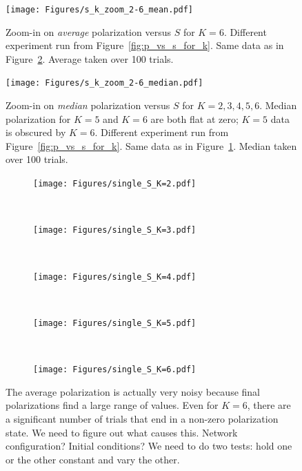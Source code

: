 \documentclass[11pt,letterpaper]{article}
\begin{document}
\begin{figure}[t!]
  \centering
    \texttt{[image: Figures/s\_k\_zoom\_2-6\_mean.pdf]}
  \caption{Zoom-in on \emph{average} polarization versus $S$ for $K=6$. 
  Different experiment run from Figure~\ref{fig:p_vs_s_for_k}. 
  Same data as in Figure~\ref{fig:zoom_median}.
  Average taken over 100 trials.}
  \label{fig:zoom_average}
\end{figure}

\begin{figure}[h!]
  \centering
    \texttt{[image: Figures/s\_k\_zoom\_2-6\_median.pdf]}
  \caption{Zoom-in on \emph{median} polarization versus $S$ for $K=2,3,4,5,6$. 
    Median polarization for $K=5$ and $K=6$ are both flat at zero; $K=5$ 
    data is obscured by $K=6$.
    Different experiment run from Figure~\ref{fig:p_vs_s_for_k}.
    Same data as in Figure~\ref{fig:zoom_average}.
    Median taken over 100 trials.
  }
  \label{fig:zoom_median}
\end{figure}


\begin{figure}[h!]
  \centering
  \begin{subfigure}[t]{\textwidth}
    \centering
    \texttt{[image: Figures/single\_S\_K=2.pdf]}
  \end{subfigure} \\
  \begin{subfigure}[t]{0.49\textwidth}
      \centering
      \texttt{[image: Figures/single\_S\_K=3.pdf]}
  \end{subfigure}
  ~
  \begin{subfigure}[t]{0.49\textwidth}
      \centering
      \texttt{[image: Figures/single\_S\_K=4.pdf]}
  \end{subfigure} \\
  \begin{subfigure}[t]{0.49\textwidth}
      \centering
      \texttt{[image: Figures/single\_S\_K=5.pdf]}
  \end{subfigure}
  ~
  \begin{subfigure}[t]{0.49\textwidth}
      \centering
      \texttt{[image: Figures/single\_S\_K=6.pdf]}
  \end{subfigure}
  \caption{The average polarization is actually very noisy because 
    final polarizations find a large range of values. Even for $K=6$, there
    are a significant number of trials that end in a non-zero polarization
    state. We need to figure out what causes this. Network configuration?
    Initial conditions? We need to do two tests: hold one or the other 
    constant and vary the other.
  }
  \label{fig:single_S_K}
\end{figure}
\end{document}
